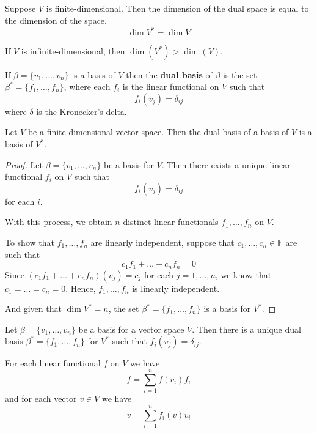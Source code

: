 \begin{remark}
	Suppose $V$ is finite-dimensional. Then the dimension of the dual space is equal to the dimension of the space.
	\[
		\dim V^\ast = \dim V
	\]

	If $V$ is infinite-dimensional, then $\dim (V^\ast) > \dim (V)$.
\end{remark}

\begin{definition}
	If $\beta = \{ v_1, \ldots, v_n \}$ is a basis of $V$ then the \textbf{dual basis} of $\beta$ is the set $\beta^\ast = \{ f_1, \ldots, f_n \}$, where each $f_i$ is the linear functional on $V$ such that 
	\[
		f_i(v_j) = \delta_{ij}
	\]
	where $\delta$ is the Kronecker's delta.
\end{definition}

\begin{theorem}
	Let $V$ be a finite-dimensional vector space. Then the dual basis of a basis of $V$ is a basis of $V^\ast$.
\end{theorem}

\begin{proof}
	Let $\beta = \{ v_1, \ldots, v_n \}$ be a basis for $V$. Then there exists a unique linear functional $f_i$ on $V$ such that
	\[
		f_i(v_j) = \delta_{ij}
	\]
	for each $i$.

	With this process, we obtain $n$ distinct linear functionals $f_1, \ldots, f_n$ on $V$.

	To show that $f_1, \ldots, f_n$ are linearly independent, suppose that $c_1, \ldots, c_n \in \mathbb{F}$ are such that
	\[
		c_1 f_1 + \ldots + c_n f_n = 0
	\]
	Since $(c_1 f_1 + \ldots + c_n f_n)(v_j) = c_j$ for each $j = 1, \ldots, n$, we know that $c_1 = \ldots = c_n = 0$. Hence, $f_1, \ldots, f_n$ is linearly independent.
	
	And given that $\dim V^\ast = n$, the set $\beta^\ast = \{ f_1, \ldots, f_n \}$ is a basis for $V^\ast$.
\end{proof}

\begin{theorem}
	Let $\beta = \{ v_1, \ldots, v_n \}$ be a basis for a vector space $V$. Then there is a unique dual basis $\beta^\ast = \{ f_1, \ldots, f_n \}$ for $V^\ast$ such that $f_i (v_j) = \delta_{ij}$.
	
	For each linear functional $f$ on $V$ we have
	\[
		f = \sum_{i=1}^n f(v_i) f_i
	\]
	and for each vector $v \in V$ we have
	\[
		v = \sum_{i=1}^n f_i(v) v_i
	\]
\end{theorem}

